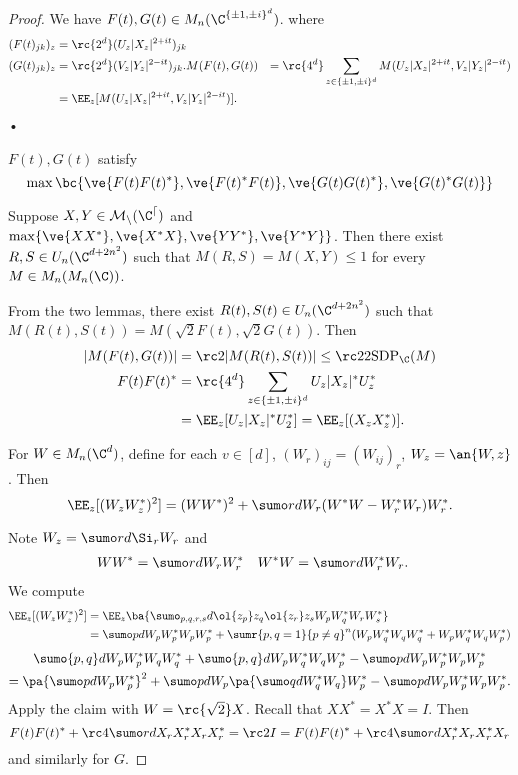 \begin{proof}
We have $F(t),G(t)\in M_n(\C^{\{\pm 1,\pm i\}^d})$.  
where
\begin{align}
(F(t)_{jk})_z&= \rc{2^d} (U_z|X_z|^{2+it})_{jk}\\
(G(t)_{jk})_z&= \rc{2^d}(V_z|Y_z|^{2-it})_{jk}.
M(F(t),G(t)) &= \rc{4^d} \sum_{z\in \{\pm 1,\pm i\}^d} M(U_z|X_z|^{2+it}, V_z|Y_z|^{2-it})\\
&=\EE_z[M(U_z|X_z|^{2+it},V_z|Y_z|^{2-it})].
\end{align}•

\begin{lem}
$F(t),G(t)$ satisfy
\[
\max\bc{
\ve{F(t)F(t)^*}, \ve{F(t)^*F(t)}, \ve{G(t)G(t)^*}, \ve{G(t)^*G(t)}
}
\]
\end{lem}
\begin{lem}
Suppose $X,Y\in \cal M_n(\C^d)$ and $\max\{\ve{XX^*}, \ve{X^*X}, \ve{YY^*}, \ve{Y^*Y}\}$. Then there exist $R,S\in U_n(\C^{d+2n^2})$ such that $M(R,S) = M(X,Y)\le 1$ for every $M\in M_n(M_n(\C))$. 
\end{lem}

From the two lemmas, there exist $R(t), S(t)\in U_n(\C^{d+2n^2})$ such that $M(R(t),S(t))=M(\sqrt 2 F(t), \sqrt 2 G(t))$. Then
\begin{align}
|M(F(t),G(t))| &= \rc 2 |M(R(t), S(t))| \le \rc 2 2\text{SDP}_\C(M)\\
F(t)F(t)^* &=\rc{4^d} \sum_{z\in \{\pm 1,\pm i\}^d} U_z|X_z|^*U_z^* \\
&=\EE_z[U_z |X_z|^* U_2^*] = \EE_z[(X_zX_z^*)].
\end{align}

\begin{clm}
For $W\in M_n(\C^d)$, define for each $v\in [d]$, $(W_r)_{ij} = (W_{ij})_r$, $W_z= \an{W,z}$. Then
\[
\EE_z [(W_zW_z^*)^2] = (WW^*)^2 + \sumo rd W_r (W^*W-W_r^*W_r) W_r^* .
\]
\end{clm}
Note $W_z = \sumo rd \Si_rW_r$ and
\begin{align}
WW^*&= \sumo rd  W_r W_r^*&
W^*W&= \sumo rd W_r^*W_r.
\end{align}
We compute
\begin{align}
\EE_z[(W_z W_z^*)^2] & = \EE_z \ba{
\sumo_{p,q,r,s}d \ol{z_p}z_q\ol{z_r}z_s W_pW_q^*W_rW_s^*
}\\
&=\sumo p d W_p W_p^* W_p W_p^* + \sumr{p,q=1}{p\ne q}^n (W_pW_q^*W_qW_q^* + W_pW_q^*W_qW_p^*)
\end{align}
\begin{multline}
\sumo{p,q}d W_pW_p^* W_qW_q^* + \sumo{p,q}d W_pW_q^*W_qW_p^* - \sumo pd W_pW_p^*W_pW_p^*
\\=\pa{\sumo pd W_pW_p^*}^2 + \sumo pd W_p\pa{\sumo qd W_q^*W_q}W_p^* - \sumo pd W_pW_p^*W_pW_p^*.
\end{multline}
Apply the claim with $W=\rc{\sqrt 2}X$. Recall that $XX^*=X^*X=I$. Then 
\[
F(t)F(t)^* + \rc 4\sumo rd X_rX_r^*X_rX_r^* = \rc 2 I = F(t)F(t)^* + \rc 4 \sumo rd X_r^*X_rX_r^*X_r
\]
and similarly for $G$.


\end{proof}
